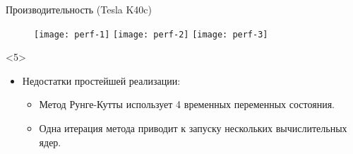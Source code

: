 \documentclass[@BEAMER_OPTIONS@]{beamer}
\begin{document}
\begin{frame}[fragile]{Производительность (Tesla K40c)}
    \begin{figure}
         {\texttt{[image: perf-1]}}%
         {\texttt{[image: perf-2]}}%
         {\texttt{[image: perf-3]}}%
    \end{figure}
    \vspace{-1\baselineskip}
    \begin{uncoverenv}<5>
        \begin{itemize}
            \item Недостатки простейшей реализации:
                \begin{itemize}
                    \item Метод Рунге-Кутты использует 4 временных переменных
                        состояния.
                    \item Одна итерация метода приводит к запуску нескольких
                        вычислительных ядер.
                \end{itemize}
        \end{itemize}
    \end{uncoverenv}
\end{frame}

\note{ }
\end{document}
